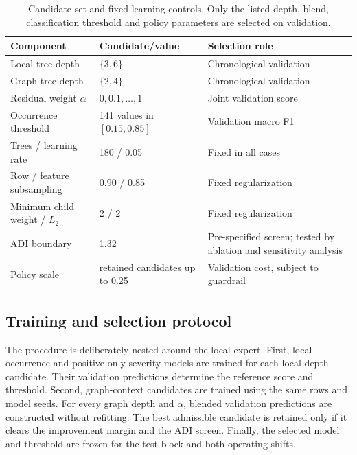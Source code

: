 \documentclass[11pt,a4paper]{article}
\begin{document}
\begin{table}[tb]\centering\small
\caption{Candidate set and fixed learning controls. Only the listed depth, blend, classification threshold and policy parameters are selected on validation.}\label{tab:hyper}
\begin{tabularx}{\linewidth}{p{.29\linewidth}p{.24\linewidth}Y}\toprule
Component & Candidate/value & Selection role \\\midrule
Local tree depth & $\{3,6\}$ & Chronological validation \\
Graph tree depth & $\{2,4\}$ & Chronological validation \\
Residual weight $\alpha$ & $0,0.1,\ldots,1$ & Joint validation score \\
Occurrence threshold & 141 values in $[0.15,0.85]$ & Validation macro F1 \\
Trees / learning rate & 180 / 0.05 & Fixed in all cases \\
Row / feature subsampling & 0.90 / 0.85 & Fixed regularization \\
Minimum child weight / $L_2$ & 2 / 2 & Fixed regularization \\
ADI boundary & 1.32 & Pre-specified screen; tested by ablation and sensitivity analysis \\
Policy scale & retained candidates up to 0.25 & Validation cost, subject to guardrail \\
\bottomrule\end{tabularx}
\end{table}

\subsection{Training and selection protocol}
The procedure is deliberately nested around the local expert. First, local occurrence and positive-only severity models are trained for each local-depth candidate. Their validation predictions determine the reference score and threshold. Second, graph-context candidates are trained using the same rows and model seeds. For every graph depth and $\alpha$, blended validation predictions are constructed without refitting. The best admissible candidate is retained only if it clears the improvement margin and the ADI screen. Finally, the selected model and threshold are frozen for the test block and both operating shifts.
\end{document}
